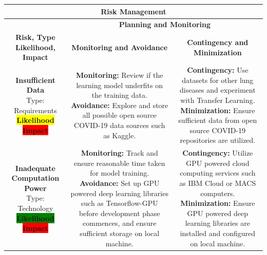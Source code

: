 \begin{longtable}
    {| p{} | p{} | p{}} 
    \hline
    \multicolumn{3}{|c|}{\textbf{Risk Management}}\\
    \hline
    \multicolumn{1}{|c|}{} & \multicolumn{2}{|c|}{\textbf{Planning and Monitoring}}\\
    \hline
    \multicolumn{1}{|c|}{ \parbox[t]{2.5cm}{\textbf{Risk, Type\\Likelihood, \\Impact}}} & \multicolumn{1}{|c|}{\textbf{Monitoring and Avoidance}} & \multicolumn{1}{|c|}{\textbf{Contingency and Minimization}}\\
    \hline
    \multicolumn{1}{|c|}{ \parbox[t]{2.5cm}{\textbf{Insufficient Data}\\Type: Requirements\\\colorbox{yellow}{\textbf{Likelihood}}\\\colorbox{red}{\textbf{Impact}}}} & \multicolumn{1}{|c|}{\parbox[t]{5.75cm}{\textbf{Monitoring:} Review if the learning model underfits on the training data.\\\textbf{Avoidance:} Explore and store all possible open source COVID-19 data sources such as Kaggle.}} & \multicolumn{1}{|c|}{\parbox[t]{5.75cm}{\textbf{Contingency:} Use datasets for other lung diseases and experiment with Transfer Learning.\\ \textbf{Minimization:} Ensure sufficient data from open source COVID-19 repositories are utilized.}}\\\hline
    \multicolumn{1}{|c|}{ \parbox[t]{2.5cm}{\textbf{Inadequate Computation Power}\\Type: Technology\\\colorbox{green}{\textbf{Likelihood}}\\\colorbox{red}{\textbf{Impact}}}} & \multicolumn{1}{|c|}{\parbox[t]{5.75cm}{\textbf{Monitoring:} Track and ensure reasonable time taken for model training.\\\textbf{Avoidance:} Set up GPU powered deep learning libraries such as Tensorflow-GPU before development phase commences, and ensure sufficient storage  on local machine.\vspace{0.3em}}} & \multicolumn{1}{|c|}{\parbox[t]{5.75cm}{\textbf{Contingency:} Utilize GPU powered cloud computing services such as IBM Cloud or MACS computers. \\ \textbf{Minimization:} Ensure GPU powered deep learning libraries are installed and configured on local machine. \vspace{0.2em}}}\\\hline

\end{longtable}
